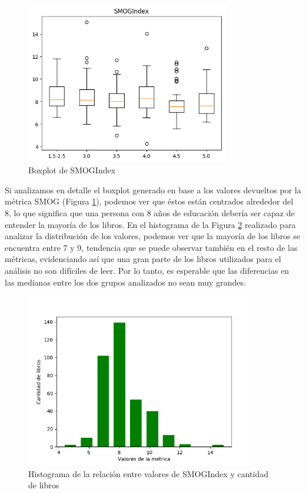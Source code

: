 \documentclass[12pt,journal,compsoc]{IEEEtran}
\begin{document}
\begin{figure}[H]
\begin{center}
  \includegraphics[width=3.5in]{../unigrams/scripts/boxplots/not-normalized-SMOGIndex.png}
  \caption{\small Boxplot de SMOGIndex}
  \label{fig:boxplotSMOG}
  \end{center}
\end{figure}

Si analizamos en detalle el boxplot generado en base a los valores devueltos por la métrica SMOG (Figura \ref{fig:boxplotSMOG}), podemos ver que éstos están centrados alrededor del 8, lo que significa que una persona con 8 años de educación debería ser capaz de entender la mayoría de los libros. En el histograma de la Figura \ref{fig:histoSMOG} realizado para analizar la distribución de los valores, podemos ver que la mayoría de los libros se encuentra entre 7 y 9, tendencia que se puede observar también en el resto de las métricas, evidenciando así que una gran parte de los libros utilizados para el análisis no son difíciles de leer. Por lo tanto, es esperable que las diferencias en las medianas entre los dos grupos analizados no sean muy grandes.

\begin{figure}[H]
\begin{center}
  \includegraphics[width=4.0in]{../unigrams/scripts/histogram/08-SMOGIndexhistogram.png}
  \caption{\small Histograma de la relación entre valores de SMOGIndex y cantidad de libros}
  \label{fig:histoSMOG}
  \end{center}
\end{figure}
\end{document}
